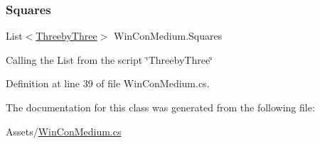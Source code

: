 \subsubsection{\texorpdfstring{Squares}{Squares}}
{\footnotesize\ttfamily List$<$\mbox{\hyperlink{class_threeby_three}{Threeby\+Three}}$>$ Win\+Con\+Medium.\+Squares}

Calling the List from the script \char`\"{}\+Threeby\+Three\char`\"{} 

Definition at line 39 of file Win\+Con\+Medium.\+cs.



The documentation for this class was generated from the following file\+:\begin{DoxyCompactItemize}
\item 
Assets/\mbox{\hyperlink{_win_con_medium_8cs}{Win\+Con\+Medium.\+cs}}\end{DoxyCompactItemize}
